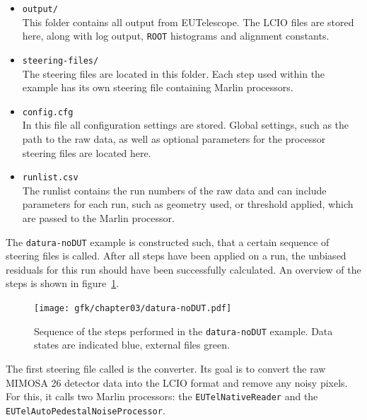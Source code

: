 \begin{itemize}

\item \texttt{output/}\\ This folder contains all output from EUTelescope. The
LCIO files are stored here, along with log output, \texttt{ROOT} histograms and
alignment constants.\\

\item \texttt{steering-files/}\\ The steering files are located in this folder.
Each step used within the example has its own steering file containing Marlin
processors.\\

\item\texttt{config.cfg}\\ In this file all configuration settings are stored.
Global settings, such as the path to the raw data, as well as optional
parameters for the processor steering files are located here.\\

\item \texttt{runlist.csv}\\ The runlist contains the run numbers of the raw
data and can include parameters for each run, such as geometry used, or
threshold applied, which are passed to the Marlin processor.\\

\end{itemize}

The \texttt{datura-noDUT} example is constructed such, that a certain sequence
of steering files is called. After all steps have been applied on a run, the
unbiased residuals for this run should have been successfully calculated. An
overview of the steps is shown in figure~\ref{fig:datura-nodutsequence}.\\

\begin{figure}[hbt]
\centering
\texttt{[image: gfk/chapter03/datura-noDUT.pdf]}
\caption[Steps performed in the \texttt{datura-noDUT} example]{Sequence of the
steps performed in the \texttt{datura-noDUT} example. Data states are indicated
blue, external files green.}
\label{fig:datura-nodutsequence}
\end{figure}

The first steering file called is the converter. Its goal is to convert the raw
MIMOSA 26 detector data into the LCIO format and remove any noisy pixels. For
this, it calls two Marlin processors: the \texttt{EUTelNativeReader} and the
\texttt{EUTelAutoPede\-stalNoiseProcessor}.\\

